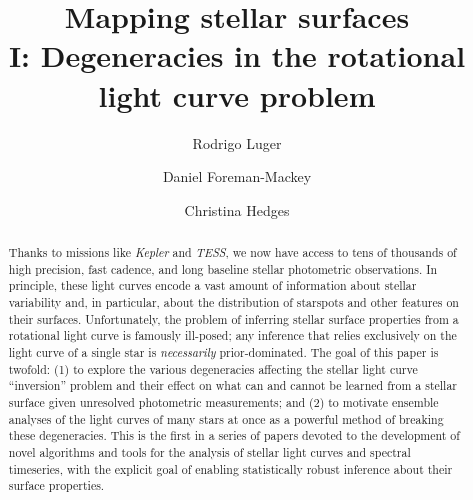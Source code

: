 \documentclass[modern]{aastex62}
\begin{document}
\title{%
    \textbf{
        Mapping stellar surfaces\\
        I: Degeneracies in the rotational light curve problem
    }
}

\author[0000-0002-0296-3826]{Rodrigo Luger}
%
\author[0000-0002-9328-5652]{Daniel Foreman-Mackey}
%
\author[0000-0002-3385-8391]{Christina Hedges}
%



\begin{abstract}
    Thanks to missions like \emph{Kepler} and \emph{TESS}, we now
    have access to tens of thousands of high precision, fast
    cadence, and long baseline stellar photometric observations.
    In principle, these light curves encode a vast amount of information about
    stellar variability and, in particular, about the distribution of
    starspots and other features on their surfaces.
    Unfortunately, the problem of inferring stellar surface properties
    from a rotational light curve is famously ill-posed;
    any inference that relies exclusively on the light curve
    of a single star is \emph{necessarily} prior-dominated.
    The goal of this paper is twofold:
    (1) to explore the various degeneracies affecting the stellar
    light curve ``inversion'' problem and their effect on
    what can and cannot be learned from a stellar surface
    given unresolved photometric measurements; and
    (2) to motivate ensemble analyses of the light curves of
    many stars at once as a powerful method of breaking
    these degeneracies.
    This is the first in a series of papers devoted to the development
    of novel algorithms and tools for the analysis of
    stellar light curves and spectral timeseries, with the
    explicit goal of enabling statistically robust inference
    about their surface properties.
\end{abstract}
\end{document}
